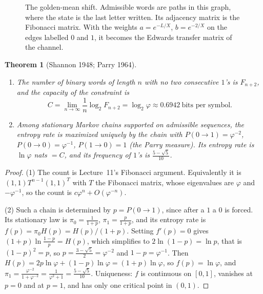 \documentclass[11pt,openany]{book}
\theoremstyle{plain}
\newtheorem{theorem}{Theorem}[chapter]
\theoremstyle{definition}
\theoremstyle{remark}
\begin{document}
\begin{figure}[ht]
\centering
{}
\caption{The golden-mean shift. Admissible words are paths in this graph, where the state is the last
letter written. Its adjacency matrix is the Fibonacci matrix. With the weights $a=e^{-L/X}$, $b=e^{-2/X}$ on
the edges labelled $0$ and $1$, it becomes the Edwards transfer matrix of the channel.}
\label{SM:fig:golden}
\end{figure}

\begin{theorem}[Shannon 1948; Parry 1964]\label{SM:thm:golden}
\begin{enumerate}[nosep]
\item The number of binary words of length $n$ with no two consecutive $1$'s is $F_{n+2}$, and the
  capacity of the constraint is
  \[
    C=\lim_{n\to\infty}\frac1n\log_2F_{n+2}=\log_2\varphi\approx0.6942\ \text{bits per symbol}.
  \]
\item Among stationary Markov chains supported on admissible sequences, the entropy rate is maximized
  uniquely by the chain with $P(0\to1)=\varphi^{-2}$, $P(0\to0)=\varphi^{-1}$, $P(1\to0)=1$ (the
  \emph{Parry measure}). Its entropy rate is $\ln\varphi$ nats $=C$, and its frequency of $1$'s is
  $\frac{5-\sqrt5}{10}$.
\end{enumerate}
\end{theorem}

\begin{proof}
(1) The count is Lecture~11's Fibonacci argument. Equivalently it is $(1,1)T^{n-1}(1,1)^T$ with $T$ the
Fibonacci matrix, whose eigenvalues are $\varphi$ and $-\varphi^{-1}$, so the count is $c\varphi^n+O(\varphi^{-n})$.

(2) Such a chain is determined by $p=P(0\to1)$, since after a $1$ a $0$ is forced. Its stationary law
is $\pi_0=\frac1{1+p}$, $\pi_1=\frac p{1+p}$, and its entropy rate is $f(p)=\pi_0H(p)=H(p)/(1+p)$. Setting
$f'(p)=0$ gives $(1+p)\ln\frac{1-p}{p}=H(p)$, which simplifies to $2\ln(1-p)=\ln p$, that is
$(1-p)^2=p$, so $p=\frac{3-\sqrt5}2=\varphi^{-2}$ and $1-p=\varphi^{-1}$. Then
$H(p)=2p\ln\varphi+(1-p)\ln\varphi=(1+p)\ln\varphi$, so $f(p)=\ln\varphi$, and
$\pi_1=\frac{\varphi^{-2}}{1+\varphi^{-2}}=\frac1{\varphi^2+1}=\frac{5-\sqrt5}{10}$. Uniqueness: $f$ is
continuous on $[0,1]$, vanishes at $p=0$ and at $p=1$, and has only one critical point in $(0,1)$.
\end{proof}
\end{document}
